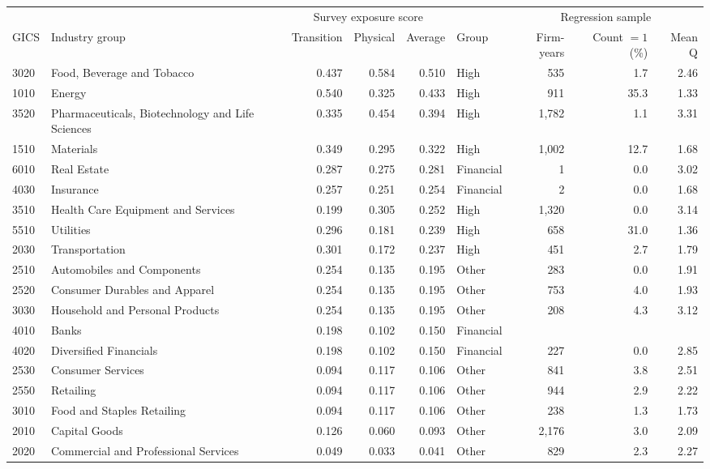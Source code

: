 \begin{tabular}{llrrrlrrr}
\toprule
 & & \multicolumn{3}{c}{Survey exposure score} & & \multicolumn{3}{c}{Regression sample} \\
\cmidrule(lr){3-5}\cmidrule(lr){7-9}
GICS & Industry group & Transition & Physical & Average & Group & Firm-years & Count $=1$ (\%) & Mean Q \\
\midrule
3020 & Food, Beverage and Tobacco & 0.437 & 0.584 & 0.510 & High & 535 & 1.7 & 2.46 \\
1010 & Energy & 0.540 & 0.325 & 0.433 & High & 911 & 35.3 & 1.33 \\
3520 & Pharmaceuticals, Biotechnology and Life Sciences & 0.335 & 0.454 & 0.394 & High & 1,782 & 1.1 & 3.31 \\
1510 & Materials & 0.349 & 0.295 & 0.322 & High & 1,002 & 12.7 & 1.68 \\
6010 & Real Estate & 0.287 & 0.275 & 0.281 & Financial & 1 & 0.0 & 3.02 \\
4030 & Insurance & 0.257 & 0.251 & 0.254 & Financial & 2 & 0.0 & 1.68 \\
3510 & Health Care Equipment and Services & 0.199 & 0.305 & 0.252 & High & 1,320 & 0.0 & 3.14 \\
5510 & Utilities & 0.296 & 0.181 & 0.239 & High & 658 & 31.0 & 1.36 \\
2030 & Transportation & 0.301 & 0.172 & 0.237 & High & 451 & 2.7 & 1.79 \\
2510 & Automobiles and Components & 0.254 & 0.135 & 0.195 & Other & 283 & 0.0 & 1.91 \\
2520 & Consumer Durables and Apparel & 0.254 & 0.135 & 0.195 & Other & 753 & 4.0 & 1.93 \\
3030 & Household and Personal Products & 0.254 & 0.135 & 0.195 & Other & 208 & 4.3 & 3.12 \\
4010 & Banks & 0.198 & 0.102 & 0.150 & Financial &  &  &  \\
4020 & Diversified Financials & 0.198 & 0.102 & 0.150 & Financial & 227 & 0.0 & 2.85 \\
2530 & Consumer Services & 0.094 & 0.117 & 0.106 & Other & 841 & 3.8 & 2.51 \\
2550 & Retailing & 0.094 & 0.117 & 0.106 & Other & 944 & 2.9 & 2.22 \\
3010 & Food and Staples Retailing & 0.094 & 0.117 & 0.106 & Other & 238 & 1.3 & 1.73 \\
2010 & Capital Goods & 0.126 & 0.060 & 0.093 & Other & 2,176 & 3.0 & 2.09 \\
2020 & Commercial and Professional Services & 0.049 & 0.033 & 0.041 & Other & 829 & 2.3 & 2.27 \\

\end{tabular}
